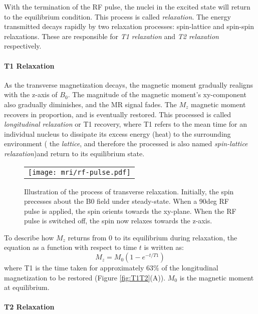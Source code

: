 With the termination of the RF pulse, the nuclei in the excited state will return to the equilibrium condition. This process is called \textit{relaxation}. 
The energy transmitted decays rapidly by two relaxation processes:  spin-lattice and spin-spin relaxations. These are responsible for \textit{T1 relaxation} and \textit{T2 relaxation} respectively.

\paragraph{T1 Relaxation} 
As the transverse magnetization decays, the magnetic moment gradually realigns with the z-axis of $B_0$. 
The magnitude of the magnetic moment's xy-component also gradually diminishes, and the MR signal fades. 
The $M_z$ magnetic moment recovers in proportion, and is eventually restored. 
This processed is called \textit{longitudinal relaxation} or T1 recovery, where T1 refers to the mean time for an individual nucleus to
dissipate its excess energy (heat) to the surrounding environment ( the \textit{lattice}, and therefore the processed is also named \textit{spin-lattice relaxation})and return to its equilibrium state. 

\begin{figure}[htb]
\begin{center}
\begin{tabular}{c}
\texttt{[image: mri/rf-pulse.pdf]}
\end{tabular}
\caption{Illustration of the process of transverse relaxation. Initially, the spin precesses about the B0 field under steady-state. When a 90deg RF pulse is applied, the spin orients towards the xy-plane. When the RF pulse is switched off, the spin now relaxes towards the z-axis.  } \label{fig:relaxation}
\end{center}
\end{figure}

To describe how $M_z$ returns from 0 to its equilibrium during relaxation, the equation as a
function with respect to time $t$ is written as: 
$$M_z = M_0 (1 - e^{-t/T1})$$
where T1 is the time taken for approximately 63$\%$ of the longitudinal magnetization to be restored (Figure \ref{fig:T1T2}(A)). 
$M_0$ is the magnetic moment at equilibrium. 

\paragraph{T2 Relaxation}

